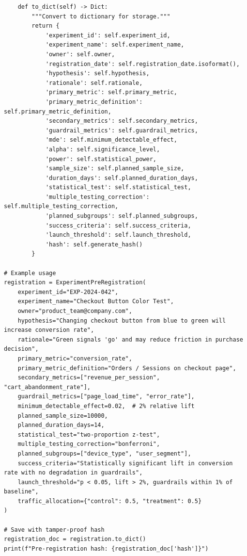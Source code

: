 \begin{lstlisting}
    def to_dict(self) -> Dict:
        """Convert to dictionary for storage."""
        return {
            'experiment_id': self.experiment_id,
            'experiment_name': self.experiment_name,
            'owner': self.owner,
            'registration_date': self.registration_date.isoformat(),
            'hypothesis': self.hypothesis,
            'rationale': self.rationale,
            'primary_metric': self.primary_metric,
            'primary_metric_definition': self.primary_metric_definition,
            'secondary_metrics': self.secondary_metrics,
            'guardrail_metrics': self.guardrail_metrics,
            'mde': self.minimum_detectable_effect,
            'alpha': self.significance_level,
            'power': self.statistical_power,
            'sample_size': self.planned_sample_size,
            'duration_days': self.planned_duration_days,
            'statistical_test': self.statistical_test,
            'multiple_testing_correction': self.multiple_testing_correction,
            'planned_subgroups': self.planned_subgroups,
            'success_criteria': self.success_criteria,
            'launch_threshold': self.launch_threshold,
            'hash': self.generate_hash()
        }

# Example usage
registration = ExperimentPreRegistration(
    experiment_id="EXP-2024-042",
    experiment_name="Checkout Button Color Test",
    owner="product_team@company.com",
    hypothesis="Changing checkout button from blue to green will increase conversion rate",
    rationale="Green signals 'go' and may reduce friction in purchase decision",
    primary_metric="conversion_rate",
    primary_metric_definition="Orders / Sessions on checkout page",
    secondary_metrics=["revenue_per_session", "cart_abandonment_rate"],
    guardrail_metrics=["page_load_time", "error_rate"],
    minimum_detectable_effect=0.02,  # 2% relative lift
    planned_sample_size=10000,
    planned_duration_days=14,
    statistical_test="two-proportion z-test",
    multiple_testing_correction="bonferroni",
    planned_subgroups=["device_type", "user_segment"],
    success_criteria="Statistically significant lift in conversion rate with no degradation in guardrails",
    launch_threshold="p < 0.05, lift > 2%, guardrails within 1% of baseline",
    traffic_allocation={"control": 0.5, "treatment": 0.5}
)

# Save with tamper-proof hash
registration_doc = registration.to_dict()
print(f"Pre-registration hash: {registration_doc['hash']}")
\end{lstlisting}

